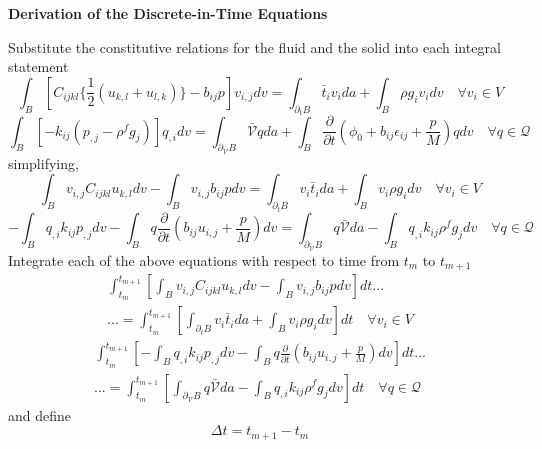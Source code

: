 \documentclass[11pt]{article} %
\begin{document}
\begin{center} \textbf{Derivation of the Discrete-in-Time Equations} \end{center}
Substitute the constitutive relations for the fluid and the solid into each integral statement
\begin{equation}
	\int_B \left[ C_{ijkl} \{ \frac{1}{2} (u_{k,l}+u_{l,k}) \} - b_{ij} p \right] v_{i,j} dv = \int_{\partial_t B} \bar{t}_i v_i da + \int_B \rho g_i v_i dv \quad \forall v_i \in V
\end{equation}
\begin{equation}
	\int_B \left[ -k_{ij} ( p_{,j} - \rho^f g_j ) \right] q_{,i} dv = \int_{\partial_{\mathcal{V}} B} \bar{\mathcal{V}} q da + \int_B \frac{\partial}{\partial t} ( \phi_0 + b_{ij} \epsilon_{ij} + \frac{p}{M} ) q dv \quad \forall q \in \mathcal{Q}
\end{equation}
simplifying,
\begin{equation}
	\int_B v_{i,j} C_{ijkl} u_{k,l} dv - \int_B v_{i,j} b_{ij} p dv = \int_{\partial_t B} v_i \bar{t}_i da + \int_B v_i \rho g_i dv \quad \forall v_i \in V
\end{equation}
\begin{equation}
	- \int_B q_{,i} k_{ij} p_{,j} dv - \int_B q \frac{\partial}{\partial t} ( b_{ij} u_{i,j} + \frac{p}{M} ) dv= \int_{\partial_{\mathcal{V}} B} q \bar{\mathcal{V}} da - \int_B q_{,i} k_{ij} \rho^f g_j dv \quad \forall q \in \mathcal{Q}
	\label{eq:weakpressure}
\end{equation}
Integrate each of the above equations with respect to time from $t_m$ to $t_{m+1}$
\begin{eqnarray}
	\int_{t_m}^{t_{m+1}} \left[ \int_B v_{i,j} C_{ijkl} u_{k,l} dv - \int_B v_{i,j} b_{ij} p dv \right] dt ... \nonumber \\
	... = \int_{t_m}^{t_{m+1}} \left[ \int_{\partial_t B} v_i \bar{t}_i da + \int_B v_i \rho g_i dv \right] dt \quad \forall v_i \in V
\end{eqnarray}
\begin{eqnarray}
	\int_{t_m}^{t_{m+1}} \left[ - \int_B q_{,i} k_{ij} p_{,j} dv - \int_B q \frac{\partial}{\partial t} ( b_{ij} u_{i,j} + \frac{p}{M} ) dv \right] dt ... \nonumber \\
	... = \int_{t_m}^{t_{m+1}} \left[ \int_{\partial_{\mathcal{V}} B} q \bar{\mathcal{V}} da - \int_B q_{,i} k_{ij} \rho^f g_j dv \right] dt \quad \forall q \in \mathcal{Q} 
\end{eqnarray}
and define
\begin{equation}
	\Delta t = t_{m+1} - t_m
\end{equation}
\end{document}
